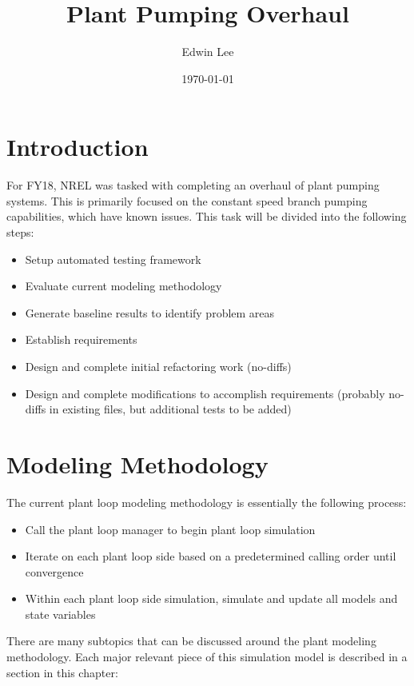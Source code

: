 \documentclass{report}
\title{Plant Pumping Overhaul}
\author{Edwin Lee}
\date{\today}
\begin{document}
    \maketitle

    \tableofcontents

    \chapter{Introduction}\label{ch:intro}

    For FY18, NREL was tasked with completing an overhaul of plant pumping systems.
    This is primarily focused on the constant speed branch pumping capabilities, which have known issues.
    This task will be divided into the following steps:

    \begin{itemize}
        \item Setup automated testing framework
        \item Evaluate current modeling methodology
        \item Generate baseline results to identify problem areas
        \item Establish requirements
        \item Design and complete initial refactoring work (no-diffs)
        \item Design and complete modifications to accomplish requirements (probably no-diffs in existing files, but additional tests to be added)
    \end{itemize}

    \chapter{Modeling Methodology}\label{ch:modeling}

    The current plant loop modeling methodology is essentially the following process:

    \begin{itemize}
        \item Call the plant loop manager to begin plant loop simulation
        \item Iterate on each plant loop side based on a predetermined calling order until convergence
        \item Within each plant loop side simulation, simulate and update all models and state variables
    \end{itemize}

    There are many subtopics that can be discussed around the plant modeling methodology.
    Each major relevant piece of this simulation model is described in a section in this chapter:
\end{document}
